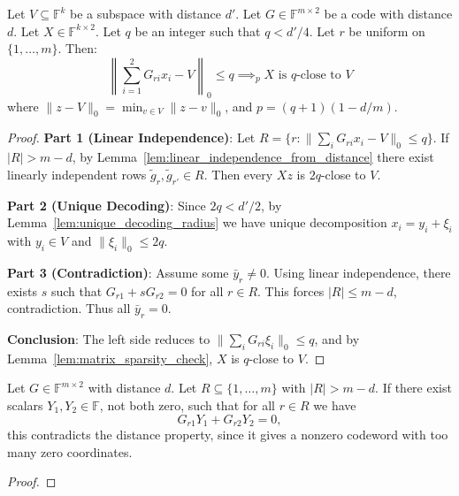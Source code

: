\begin{theorem}[Subspace Distance Check: Special Case $n=2$]\label{thm:subspace_distance_check_n2}  \leanok
{}
Let $V \subseteq \mathbb{F}^k$ be a subspace with distance $d'$.
Let $G \in \mathbb{F}^{m \times 2}$ be a code with distance $d$.
Let $X \in \mathbb{F}^{k \times 2}$.
Let $q$ be an integer such that $q < d'/4$.
Let $r$ be uniform on $\{1, \ldots, m\}$.
Then:
\[ \left\|\sum_{i=1}^2 G_{ri} x_i - V\right\|_0 \leq q \implies_{p} X \text{ is } q\text{-close to } V \]
where $\|z - V\|_0 = \min_{v \in V} \|z - v\|_0$, and $p = (q+1)(1 - d/m)$.
\end{theorem}
\begin{proof} \leanok
\textbf{Part 1 (Linear Independence)}: Let $R = \{r : \|\sum_i G_{ri} x_i - V\|_0 \leq q\}$. If $|R| > m-d$, by Lemma~\ref{lem:linear_independence_from_distance} there exist linearly independent rows $\tilde{g}_r, \tilde{g}_{r'} \in R$. Then every $Xz$ is $2q$-close to $V$.

\textbf{Part 2 (Unique Decoding)}: Since $2q < d'/2$, by Lemma~\ref{lem:unique_decoding_radius} we have unique decomposition $x_i = y_i + \xi_i$ with $y_i \in V$ and $\|\xi_i\|_0 \leq 2q$.

\textbf{Part 3 (Contradiction)}: Assume some $\bar{y}_r \neq 0$. Using linear independence, there exists $s$ such that $G_{r1} + sG_{r2} = 0$ for all $r \in R$. This forces $|R| \leq m-d$, contradiction. Thus all $\bar{y}_r = 0$.

\textbf{Conclusion}: The left side reduces to $\|\sum_i G_{ri} \xi_i\|_0 \leq q$, and by Lemma~\ref{lem:matrix_sparsity_check}, $X$ is $q$-close to $V$.
\end{proof}

\begin{lemma}\label{lem:subspace_distance_contradiction}\leanok {}
Let $G \in \mathbb{F}^{m \times 2}$ with distance $d$. Let $R \subseteq \{1, \ldots, m\}$ with $|R| > m-d$.
If there exist scalars $Y_1, Y_2 \in \mathbb{F}$, not both zero, such that for all $r \in R$ we have
\[
G_{r1}Y_1 + G_{r2}Y_2 = 0,
\]
this contradicts the distance property, since it gives a nonzero codeword with too many zero coordinates.
\end{lemma}
\begin{proof}
  \leanok
\end{proof}

